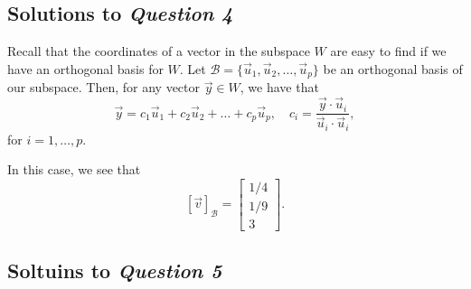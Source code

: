 \subsection{Solutions to \textit{Question 4}}
Recall that the coordinates of a vector in the subspace \(W\) are easy to find if we have an orthogonal basis for \(W\). Let 
\(\mathcal{B} = \{\vec{u}_1, \vec{u}_2, \dots, \vec{u}_p\}\) be an orthogonal basis of our subspace. Then, for any vector \(\vec{y} \in W\), we have that 
\[\vec{y} = c_1\vec{u}_1 + c_2\vec{u}_2 + \dots + c_p\vec{u}_p, \quad c_i = \frac{\vec{y} \cdot \vec{u}_i}{\vec{u}_i\cdot \vec{u}_i},\] for \(i = 1, \dots, p\).

In this case, we see that \[[\vec{v}]_\mathcal{B} = \begin{bmatrix}1/4 \\ 1/9 \\ 3\end{bmatrix}.\]

\subsection{Soltuins to \textit{Question 5}}

		\begin{figure}[H]
			\centering
		\end{figure}
